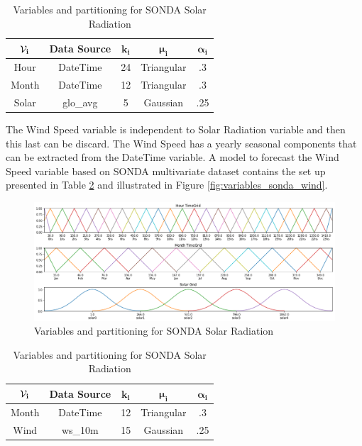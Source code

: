 \begin{table}[htb]
    \centering
    \begin{tabular}{|c|c|c|c|c|} \hline
        $\mathbf{\mathcal{V}_i}$ & \textbf{Data Source} & $\mathbf{k_i}$ & $\mathbf{\mu_i}$ & $\mathbf{\alpha_i}$  \\ \hline
        Hour & DateTime & 24 & Triangular & .3 \\ \hline 
        Month & DateTime & 12 & Triangular & .3 \\ \hline 
        Solar & glo\_avg & 5 & Gaussian & .25 \\ \hline 
    \end{tabular}
    \caption{Variables and partitioning for SONDA Solar Radiation}
    \label{tab:variables_sonda_solar}
\end{table}

The Wind Speed variable is independent to Solar Radiation variable and then this last can be discard. The Wind Speed has a yearly seasonal components that can be extracted from the DateTime variable.  A model to forecast the Wind Speed variable based on SONDA  multivariate dataset contains the set up presented in Table \ref{tab:variables_sonda_wind} and illustrated in Figure \ref{fig:variables_sonda_wind}.

\begin{figure}[htb]
    \centering
    \includegraphics[width=\textwidth]{figures/variables_sonda_solar.png}
    \caption{Variables and partitioning for SONDA Solar Radiation}
    \label{fig:variables_sonda_solar}
\end{figure}

\begin{table}[htb]
    \centering
    \begin{tabular}{|c|c|c|c|c|} \hline
        $\mathbf{\mathcal{V}_i}$ & \textbf{Data Source} & $\mathbf{k_i}$ & $\mathbf{\mu_i}$ & $\mathbf{\alpha_i}$  \\ \hline
        Month & DateTime & 12 & Triangular & .3 \\ \hline 
        Wind & ws\_10m & 15 & Gaussian & .25 \\ \hline 
    \end{tabular}
    \caption{Variables and partitioning for SONDA Solar Radiation}
    \label{tab:variables_sonda_wind}
\end{table}

